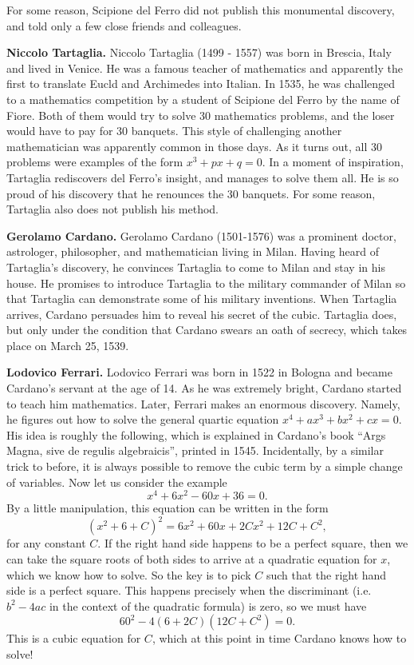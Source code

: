 \documentclass[11pt, reqno]{amsart}
\theoremstyle{remark}
\numberwithin{equation}{subsection}
\numberwithin{figure}{section}
\numberwithin{table}{section}
\newcommand{\sss}{\vspace{2.5 mm}}
\begin{document}
For some reason, Scipione del Ferro did not publish this monumental discovery, and told only a few close friends and colleagues.

\sss

\textbf{Niccolo Tartaglia.} Niccolo Tartaglia (1499 - 1557) was born in Brescia, Italy and lived in Venice. He was a famous teacher of mathematics and apparently the first to translate Eucld and Archimedes into Italian. In 1535, he was challenged to a mathematics competition by a student of Scipione del Ferro by the name of Fiore. Both of them would try to solve 30 mathematics problems, and the loser would have to pay for 30 banquets. This style of challenging another mathematician was apparently common in those days.
As it turns out, all 30 problems were examples of the form $x^3 + px + q = 0$. In a moment of inspiration, Tartaglia rediscovers del Ferro's insight, and manages to solve them all. He is so proud of his discovery that he renounces the 30 banquets.
For some reason, Tartaglia also does not publish his method.

\sss

\textbf{Gerolamo Cardano.} Gerolamo Cardano (1501-1576) was a prominent doctor, astrologer, philosopher, and mathematician living in Milan. Having heard of Tartaglia's discovery, he convinces Tartaglia to come to Milan and stay in his house. He promises to introduce Tartaglia to the military commander of Milan so that Tartaglia can demonstrate some of his military inventions.
When Tartaglia arrives, Cardano persuades him to reveal his secret of the cubic. Tartaglia does, but only under the condition that Cardano swears an oath of secrecy, which takes place on March 25, 1539.

\sss

\textbf{Lodovico Ferrari.} Lodovico Ferrari was born in 1522 in Bologna and became Cardano's servant at the age of 14. As he was extremely bright, Cardano started to teach him mathematics. 
Later, Ferrari makes an enormous discovery. Namely, he figures out how to solve the general quartic equation $x^4 + ax^3 + bx^2 + cx = 0$.
His idea is roughly the following, which is explained in Cardano's book ``Args Magna, sive de regulis algebraicis'', printed in 1545.
Incidentally, by a similar trick to before, it is always possible to remove the cubic term by a simple change of variables.
Now let us consider the example $$x^4 + 6x^2 - 60x + 36 = 0.$$
By a little manipulation, this equation can be written in the form
$$(x^2 + 6 + C)^2 = 6x^2 + 60x + 2Cx^2 + 12C + C^2,$$
for any constant $C$. 
If the right hand side happens to be a perfect square, then we can take the square roots of both sides to arrive at a quadratic equation for $x$, which we know how to solve.
So the key is to pick $C$ such that the right hand side is a perfect square.
This happens precisely when the discriminant (i.e. $b^2 - 4ac$ in the context of the quadratic formula) is zero, so we must have
$$60^2 - 4(6+2C)(12C + C^2) = 0.$$
This is a cubic equation for $C$, which at this point in time Cardano knows how to solve!
\end{document}
